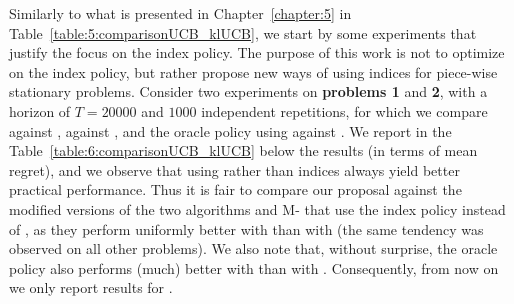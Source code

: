 
Similarly to what is presented in Chapter~\ref{chapter:5} in Table~\ref{table:5:comparisonUCB_klUCB}, we start by some experiments that justify the focus on the \klUCB{} index policy.
The purpose of this work is not to optimize on the index policy, but rather propose new ways of using indices for piece-wise stationary problems.
%
Consider two experiments on \textbf{problems 1} and \textbf{2}, with a horizon of $T=20000$ and $1000$ independent repetitions,
for which we compare \CUSUMUCB{} against \CUSUMklUCB, \MUCB{} against \MklUCB, and the oracle policy using \UCB{} against \klUCB.
We report in the Table~\ref{table:6:comparisonUCB_klUCB} below the results (in terms of mean regret),
and we observe that using \klUCB{} rather than \UCB{} indices always yield better practical performance.
%
Thus it is fair to compare our proposal against the modified versions of the two algorithms \CUSUM{} and $\mathrm{M}$- that use the \klUCB{} index policy instead of \UCB, as they perform uniformly better with \klUCB{} than with \UCB{} (the same tendency was observed on all other problems).
We also note that, without surprise, the oracle policy also performs (much) better with \klUCB{} than with \UCB.
Consequently, from now on we only report results for \klUCB.

